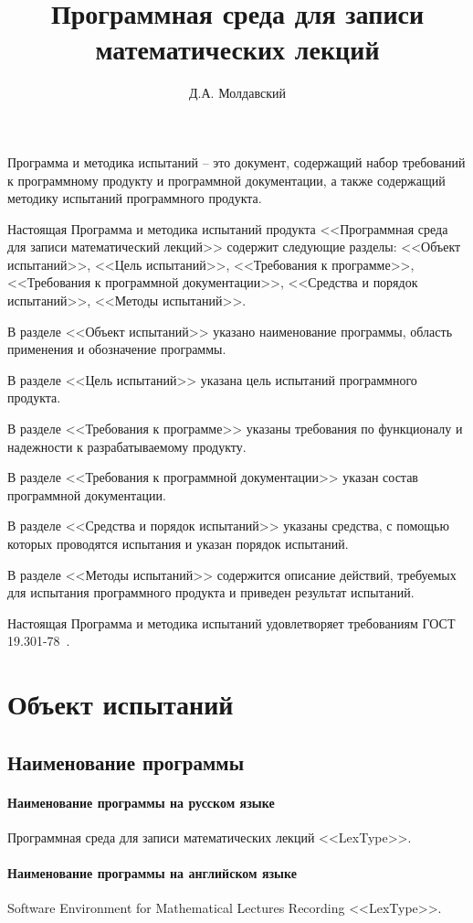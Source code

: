 \documentclass[testmethods]{espd}
\author{Д.А. Молдавский}
\title{Программная среда для записи\\математических лекций}
\begin{document}
\annotation

Программа и методика испытаний -- это документ, содержащий набор требований к программному продукту и программной документации, а также содержащий методику испытаний программного продукта.

Настоящая Программа и методика испытаний продукта <<Программная среда для записи математический лекций>> содержит следующие разделы: <<Объект испытаний>>, <<Цель испытаний>>, <<Требования к программе>>, <<Требования к программной документации>>, <<Средства и порядок испытаний>>, <<Методы испытаний>>.

В разделе <<Объект испытаний>> указано наименование программы, область применения и обозначение программы.

В разделе <<Цель испытаний>> указана цель испытаний программного продукта.

В разделе <<Требования к программе>> указаны требования по функционалу и надежности к разрабатываемому продукту.

В разделе <<Требования к программной документации>> указан состав программной документации.

В разделе <<Средства и порядок испытаний>> указаны средства, с помощью которых проводятся испытания и указан порядок испытаний.

В разделе <<Методы испытаний>> содержится описание действий, требуемых для испытания программного продукта и приведен результат испытаний.

Настоящая Программа и методика испытаний удовлетворяет требованиям ГОСТ 19.301-78~\cite{espd301}.

\tableofcontents

\section{Объект испытаний}
\subsection{Наименование программы}
\paragraph{Наименование программы на русском языке}
Программная среда для записи математических лекций <<LexType>>.
\paragraph{Наименование программы на английском языке}
Software Environment for Mathematical Lectures Recording <<LexType>>.
\end{document}

